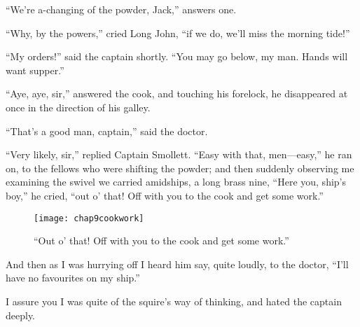 \enquote{We’re a-changing of the powder, Jack,} answers one.

\enquote{Why, by the powers,} cried Long John, \enquote{if we do, we’ll miss the morning tide!}

\enquote{My orders!} said the captain shortly. \enquote{You may go below, my man. Hands will want supper.}

\enquote{Aye, aye, sir,} answered the cook, and touching his forelock, he disappeared at once in the direction of his galley.

\enquote{That’s a good man, captain,} said the doctor.

\enquote{Very likely, sir,} replied Captain Smollett. \enquote{Easy with that, men---easy,} he ran on, to the fellows who were shifting the powder; and then suddenly observing me examining the swivel we carried amidships, a long brass nine, \enquote{Here you, ship’s boy,} he cried, \enquote{out o’ that! Off with you to the cook and get some work.}

\begin{figure}[p]
\centering
\texttt{[image: chap9cookwork]}
\caption[\enquote{Off with you to the cook and get some work.}]{\enquote{Out o’ that! Off with you to the cook and get some work.}}
\end{figure}


And then as I was hurrying off I heard him say, quite loudly, to the doctor, \enquote{I’ll have no favourites on my ship.}

I assure you I was quite of the squire’s way of thinking, and hated the captain deeply.